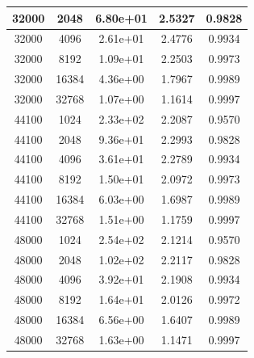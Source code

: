 \begin{table}[htbp]
\begin{tabular}{|c|c|c|c|c|}
32000 & 2048 & 6.80e+01 & 2.5327 & 0.9828 \\ \hline
32000 & 4096 & 2.61e+01 & 2.4776 & 0.9934 \\ \hline
32000 & 8192 & 1.09e+01 & 2.2503 & 0.9973 \\ \hline
32000 & 16384 & 4.36e+00 & 1.7967 & 0.9989 \\ \hline
32000 & 32768 & 1.07e+00 & 1.1614 & 0.9997 \\ \hline
44100 & 1024 & 2.33e+02 & 2.2087 & 0.9570 \\ \hline
44100 & 2048 & 9.36e+01 & 2.2993 & 0.9828 \\ \hline
44100 & 4096 & 3.61e+01 & 2.2789 & 0.9934 \\ \hline
44100 & 8192 & 1.50e+01 & 2.0972 & 0.9973 \\ \hline
44100 & 16384 & 6.03e+00 & 1.6987 & 0.9989 \\ \hline
44100 & 32768 & 1.51e+00 & 1.1759 & 0.9997 \\ \hline
48000 & 1024 & 2.54e+02 & 2.1214 & 0.9570 \\ \hline
48000 & 2048 & 1.02e+02 & 2.2117 & 0.9828 \\ \hline
48000 & 4096 & 3.92e+01 & 2.1908 & 0.9934 \\ \hline
48000 & 8192 & 1.64e+01 & 2.0126 & 0.9972 \\ \hline
48000 & 16384 & 6.56e+00 & 1.6407 & 0.9989 \\ \hline
48000 & 32768 & 1.63e+00 & 1.1471 & 0.9997 \\ \hline
\end{tabular}
\end{table}
